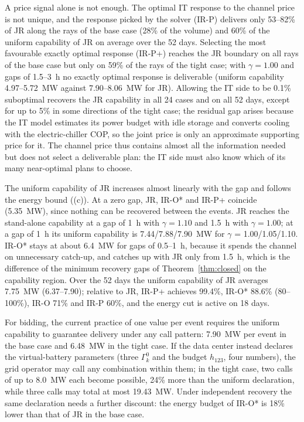 A price signal alone is not enough. The optimal IT response to the channel price is not unique, and the response
picked by the solver (IR-P) delivers only 53--82\% of JR along the rays of the base case (28\% of the volume) and 60\%
of the uniform capability of JR on average over the 52 days. Selecting the most favourable exactly optimal response
(IR-P+) reaches the JR boundary on all rays of the base case but only on 59\% of the rays of the tight case; with
$\gamma=1.00$ and gaps of 1.5--3~h no exactly optimal response is deliverable (uniform capability 4.97--5.72~MW against
7.90--8.06~MW for JR). Allowing the IT side to be 0.1\% suboptimal recovers the JR capability in all 24 cases and on all
52 days, except for up to 5\% in some directions of the tight case; the residual gap arises because the IT model
estimates its power budget with idle storage and converts cooling with the electric-chiller COP, so the joint price is
only an approximate supporting price for it. The channel price thus contains almost all the information needed but
does not select a deliverable plan: the IT side must also know which of its many near-optimal plans to choose.

The uniform capability of JR increases almost linearly with the gap and follows the energy bound
((c)). At a zero gap, JR, IR-O* and IR-P+ coincide (5.35~MW), since nothing can be recovered between
the events. JR reaches the stand-alone capability at a gap of 1~h with $\gamma=1.10$ and 1.5~h with $\gamma=1.00$; at a
gap of 1~h its uniform capability is 7.44/7.88/7.90~MW for $\gamma$ = 1.00/1.05/1.10. IR-O* stays at about 6.4~MW for gaps
of 0.5--1~h, because it spends the channel on unnecessary catch-up, and catches up with JR only from 1.5~h, which is the
difference of the minimum recovery gaps of Theorem~\ref{thm:closed} on the capability region. Over the 52 days the
uniform capability of JR averages 7.75~MW (6.37--7.90); relative to JR, IR-P+ achieves 99.4\%, IR-O* 88.6\% (80--100\%),
IR-O 71\% and IR-P 60\%, and the energy cut is active on 18 days.

For bidding, the current practice of one value per event requires the uniform capability to guarantee delivery under
any call pattern: 7.90~MW per event in the base case and 6.48~MW in the tight case. If the data center instead declares
the virtual-battery parameters (three $\Gamma^0_k$ and the budget $h_{123}$, four numbers), the grid operator may call
any combination within them; in the tight case, two calls of up to 8.0~MW each become possible, 24\% more than the
uniform declaration, while three calls may total at most 19.43~MW. Under independent recovery the same declaration
needs a further discount: the energy budget of IR-O* is 18\% lower than that of JR in the base case.

